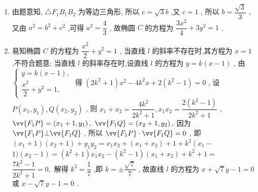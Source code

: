 \begin{enumerate}
    \begin{jieda}
    \begin{enumerate}
        \item 由题意知, $ \bigtriangleup {F}_{1}{B}_{1}{B}_{2} $ 为等边三角形,
            所以 $ c = \sqrt{3}b $ ,又 $ c = 1 $ ,
            所以 $ b = \dfrac{\sqrt{3}}{3} $ ,
            又由 $ {a}^{2} = {b}^{2} + {c}^{2} $ ,可得 $ {a}^{2} = \dfrac{4}{3} $ ,
            故椭圆 $ C $ 的方程为 $ \dfrac{3{x}^{2}}{4} + 3{y}^{2} = 1 $ .
        \item 易知椭圆 $ C $ 的方程为 $ \dfrac{{x}^{2}}{2} + {y}^{2} = 1 $ ,
            当直线 $ l $ 的斜率不存在时,其方程为 $ x = 1 $ ,不符合题意;
            当直线 $ l $ 的斜率存在时,设直线 $ l $ 的方程为 $ y = k\left( {x - 1}\right) $ ,
            由 $ \left\{  \begin{array}{l} y = k\left( {x - 1}\right) , \\  \dfrac{{x}^{2}}{2} + {y}^{2} = 1, \end{array}\right. $
            得 $ \left( {2{k}^{2} + 1}\right) {x}^{2} - 4{k}^{2}x + 2\left( {{k}^{2} - 1}\right)  = 0 $ ,
            设 $ P\left( {{x}_{1},{y}_{1}}\right) ,Q\left( {{x}_{2},{y}_{2}}\right) $ ,
            则 $ {x}_{1} + {x}_{2} = \dfrac{4{k}^{2}}{2{k}^{2} + 1},{x}_{1}{x}_{2} = \dfrac{2\left( {{k}^{2} - 1}\right) }{2{k}^{2} + 1} $ ,
            $ \vv{{F}_{1}P} = \left( {{x}_{1} + 1,{y}_{1}}\right) , $
            $ \vv{{F}_{1}Q} = \left( {{x}_{2} + 1,{y}_{2}}\right) , $
            因为 $ \vv{{F}_{1}P} \bot  \vv{{F}_{1}Q} $ ,
            所以 $ \vv{{F}_{1}P} \cdot  \vv{{F}_{1}Q} = 0 $ ,
            即 $ \left( {{x}_{1} + 1}\right) \left( {{x}_{2} + 1}\right)  + {y}_{1}{y}_{2} = {x}_{1}{x}_{2} + \left( {{x}_{1} + {x}_{2}}\right)  + 1 + {k}^{2}\left( {{x}_{1} - }\right. $
            $ 1)\left( {{x}_{2} - 1}\right)  = \left( {{k}^{2} + 1}\right) {x}_{1}{x}_{2} - \left( {{k}^{2} - 1}\right) \left( {{x}_{1} + {x}_{2}}\right)  + {k}^{2} + 1 = $
            $ \dfrac{7{k}^{2} - 1}{2{k}^{2} + 1} = 0, $
            解得 $ {k}^{2} = \dfrac{1}{7} $ ,即 $ k =  \pm  \dfrac{\sqrt{7}}{7} $ ,
            故直线 $ l $ 的方程为 $ x + \sqrt{7}y - 1 = 0 $ 或 $ x - \sqrt{7}y - 1 = 0 $ .
    \end{enumerate}
    \end{jieda}
\end{enumerate}

\clearpage
